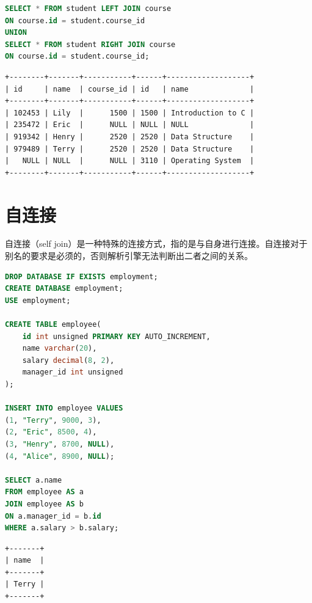\documentclass[12pt, openany, oneside]{book}
\begin{document}
\begin{lstlisting}[language=SQL]
SELECT * FROM student LEFT JOIN course
ON course.id = student.course_id
UNION
SELECT * FROM student RIGHT JOIN course
ON course.id = student.course_id;
\end{lstlisting}

\begin{tcolorbox}
\begin{verbatim}
+--------+-------+-----------+------+-------------------+
| id     | name  | course_id | id   | name              |
+--------+-------+-----------+------+-------------------+
| 102453 | Lily  |      1500 | 1500 | Introduction to C |
| 235472 | Eric  |      NULL | NULL | NULL              |
| 919342 | Henry |      2520 | 2520 | Data Structure    |
| 979489 | Terry |      2520 | 2520 | Data Structure    |
|   NULL | NULL  |      NULL | 3110 | Operating System  |
+--------+-------+-----------+------+-------------------+
	\end{verbatim}
\end{tcolorbox}

\vspace{0.5cm}

\section{自连接}

自连接（self join）是一种特殊的连接方式，指的是与自身进行连接。自连接对于别名的要求是必须的，否则解析引擎无法判断出二者之间的关系。\\


\begin{lstlisting}[language=SQL]
DROP DATABASE IF EXISTS employment;
CREATE DATABASE employment;
USE employment;

CREATE TABLE employee(
    id int unsigned PRIMARY KEY AUTO_INCREMENT,
    name varchar(20),
    salary decimal(8, 2),
    manager_id int unsigned
);

INSERT INTO employee VALUES
(1, "Terry", 9000, 3),
(2, "Eric", 8500, 4),
(3, "Henry", 8700, NULL),
(4, "Alice", 8900, NULL);

SELECT a.name
FROM employee AS a
JOIN employee AS b
ON a.manager_id = b.id
WHERE a.salary > b.salary;
\end{lstlisting}

\begin{tcolorbox}
\begin{verbatim}
+-------+
| name  |
+-------+
| Terry |
+-------+
	\end{verbatim}
\end{tcolorbox}
\end{document}
